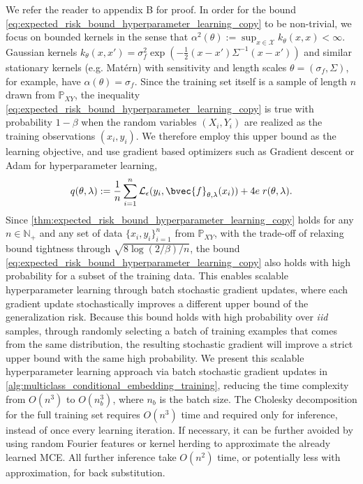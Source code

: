 \documentclass[twoside]{article}
\begin{document}
		We refer the reader to appendix B for proof. In order for the bound \eqref{eq:expected_risk_bound_hyperparameter_learning_copy} to be non-trivial, we focus on bounded kernels in the sense that $\alpha^{2}(\theta) := \sup_{x \in \mathcal{X}} k_{\theta}(x, x) < \infty$. Gaussian kernels $k_{\theta}(x, x') = \sigma_{f}^{2} \exp{( - \frac{1}{2}(x - x') \Sigma^{-1} (x - x') )}$ and similar stationary kernels (e.g. Mat\'{e}rn) with sensitivity and length scales $\theta = (\sigma_{f}, \Sigma)$, for example, have $\alpha(\theta) = \sigma_{f}$. Since the training set itself is a sample of length $n$ drawn from $\mathbb{P}_{X Y}$, the inequality \eqref{eq:expected_risk_bound_hyperparameter_learning_copy} is true with probability $1 - \beta$ when the random variables $(X_{i}, Y_{i})$ are realized as the training observations $(x_{i}, y_{i})$. We therefore employ this upper bound as the learning objective, and use gradient based optimizers such as Gradient descent or Adam \citep{kingma2014adam} for hyperparameter learning,
		\begin{equation}
			q(\theta, \lambda) := \frac{1}{n} \sum_{i = 1}^{n} \mathcal{L}_{\epsilon}(y_{i}, \bvec{f}_{\theta, \lambda}(x_{i})) + 4 e \; r(\theta, \lambda).
		\label{eq:learning_objective}
		\end{equation}
		Since \cref{thm:expected_risk_bound_hyperparameter_learning_copy} holds for any $n \in \mathbb{N}_{+}$ and any set of data $\{x_{i}, y_{i}\}_{i = 1}^{n}$ from $\mathbb{P}_{X Y}$, with the trade-off of relaxing bound tightness through $\sqrt{8 \log{(2 / \beta)} / n}$, the bound \eqref{eq:expected_risk_bound_hyperparameter_learning_copy} also holds with high probability for a subset of the training data. This enables scalable hyperparameter learning through batch stochastic gradient updates, where each gradient update stochastically improves a different upper bound of the generalization risk. Because this bound holds with high probability over \textit{iid} samples, through randomly selecting a batch of training examples that comes from the same distribution, the resulting stochastic gradient will improve a strict upper bound with the same high probability. We present this scalable hyperparameter learning approach via batch stochastic gradient updates in \cref{alg:multiclass_conditional_embedding_training}, reducing the time complexity from $O(n^{3})$ to $O(n_{b}^{3})$, where $n_{b}$ is the batch size. The Cholesky decomposition for the full training set requires $O(n^{3})$ time and required only for inference, instead of once every learning iteration. If necessary, it can be further avoided by using random Fourier features \citep{rahimi2008random} or kernel herding \citep{chen2010super} to approximate the already learned \gls{MCE}. All further inference take $O(n^{2})$ time, or potentially less with approximation, for back substitution. 
		
\end{document}
